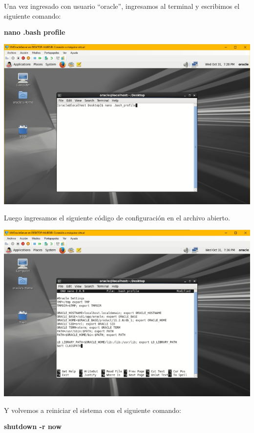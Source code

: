 \vspace{\baselineskip}

Una vez ingresado con usuario “oracle”, ingresamos al terminal y escribimos el siguiente comando:
	\begin{center}
		\textbf{\large nano .bash profile}		
	\end{center}
\begin{center}
	\includegraphics[width=14cm]{./Imagenes/55} 
\end{center} 

\vspace{\baselineskip}

Luego ingresamos el siguiente código de configuración en el archivo abierto.
\begin{center}
	\includegraphics[width=14cm]{./Imagenes/56} 
\end{center} 

\vspace{\baselineskip}

Y volvemos a reiniciar el sistema con el siguiente comando:
\begin{center}
	\textbf{\large shutdown -r now}		
\end{center}



